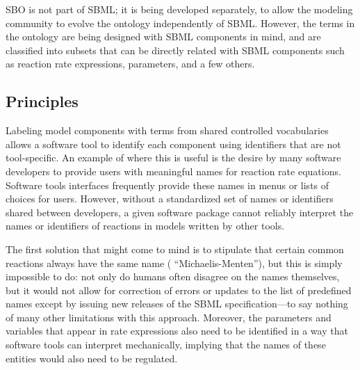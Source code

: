 SBO is not part of SBML; it is being developed separately, to
allow the modeling community to evolve the ontology independently
of SBML.  However, the terms in the ontology are being designed
with SBML components in mind, and are classified into subsets that
can be directly related with SBML components such as reaction rate
expressions, parameters, and a few others.     


\subsection{Principles}
\label{sec:sbo-principles}

Labeling model components with terms from shared controlled
vocabularies allows a software tool to identify each component using
identifiers that are not tool-specific.  An example of where this
is useful is the desire by many software developers to provide
users with meaningful names for reaction rate equations.  Software
tools  interfaces frequently provide these names
in menus or lists of choices for users.  However, without a
standardized set of names or identifiers shared between
developers, a given software package cannot reliably interpret the
names or identifiers of reactions  in models written
by other tools.

The first solution that might come to mind is to stipulate that
certain common reactions always have the same name (\eg
``Michaelis-Menten''), but this is simply impossible to do: not
only do humans often disagree on the names themselves, but it
would not allow for correction of errors or updates to the list of
predefined names except by issuing new releases of the SBML
specification---to say nothing of many other limitations with this
approach.  Moreover, the parameters and variables that appear in
rate expressions also need to be identified in a way that software
tools can interpret mechanically, implying that the names of these
entities would also need to be regulated.

